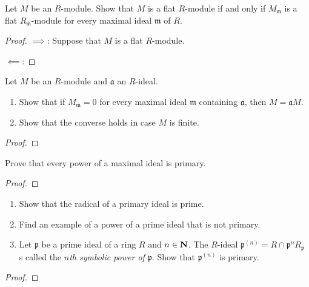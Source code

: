 \newpage
\begin{problem}
Let $M$ be an $R$-module. Show that $M$ is a flat $R$-module if
and only if $M_{\mathfrak{m}}$ is a flat
$R_{\mathfrak{m}}$-module for every maximal ideal $\mathfrak{m}$
of $R$.
\end{problem}
\begin{proof}
$\implies$: Suppose that $M$ is a flat $R$-module.

$\impliedby$:
\end{proof}
\newpage
\begin{problem}
Let $M$ be an $R$-module and $\mathfrak{a}$ an $R$-ideal.
\begin{enumerate}[noitemsep,label=(\alph*)]
\item Show that if $M_{\mathfrak{m}}=0$ for every maximal ideal
  $\mathfrak{m}$ containing $\mathfrak{a}$, then $M=\mathfrak{a}M$.
\item Show that the converse holds in case $M$ is finite.
\end{enumerate}
\end{problem}
\begin{proof}
\end{proof}
\newpage
\begin{problem}
Prove that every power of a maximal ideal is primary.
\end{problem}
\begin{proof}
\end{proof}
\newpage
\begin{problem}
\begin{enumerate}[noitemsep,label=(\alph*)]
\item Show that the radical of a primary ideal is prime.
\item Find an example of a power of a prime ideal that is not
  primary.
\item Let $\mathfrak{p}$ be a prime ideal of a ring $R$ and
  $n\in\mathbf{N}$. The $R$-ideal
  $\mathfrak{p}^{(n)}=R\cap\mathfrak{p}^nR_{\mathfrak{p}}$ s
  called the \emph{$n$th symbolic power of $\mathfrak{p}$}. Show
  that $\mathfrak{p}^{(n)}$ is primary.
\end{enumerate}
\end{problem}
\begin{proof}
\end{proof}

